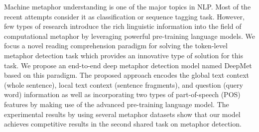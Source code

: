 Machine metaphor understanding is one of the major topics in NLP. Most of the recent attempts consider it as classification or sequence tagging task. However, few types of research introduce the rich linguistic information into the field of computational metaphor by leveraging powerful pre-training language models. We focus a novel reading comprehension paradigm for solving the token-level metaphor detection task which provides an innovative type of solution for this task. We propose an end-to-end deep metaphor detection model named DeepMet based on this paradigm. The proposed approach encodes the global text context (whole sentence), local text context (sentence fragments), and question (query word) information as well as incorporating two types of part-of-speech (POS) features by making use of the advanced pre-training language model. The experimental results by using several metaphor datasets show that our model achieves competitive results in the second shared task on metaphor detection.
